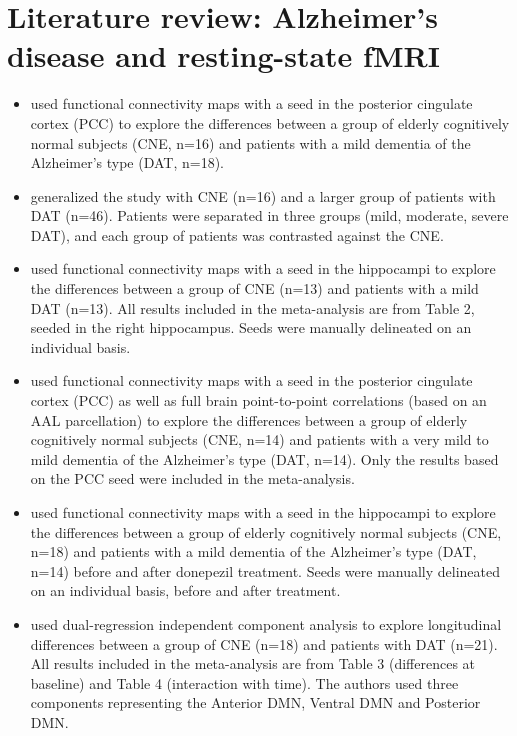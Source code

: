 \documentclass[authoryear]{elsarticle}
\begin{document}
\section*{Literature review: Alzheimer’s disease and resting-state fMRI} 
\begin{itemize}
\item \cite{Zhang2009a} used functional connectivity maps with a seed in the posterior cingulate cortex (PCC) to explore the differences between a group of elderly cognitively normal subjects (CNE, n=16) and patients with a mild dementia of the Alzheimer’s type (DAT, n=18).

\item \cite{Zhang2010} generalized the \cite{Zhang2009a} study with CNE (n=16) and a larger group of patients with DAT (n=46). Patients were separated in three groups (mild, moderate, severe DAT), and each group of patients was contrasted against the CNE.
\item \cite{Wang2006a} used functional connectivity maps with a seed in the hippocampi to explore the differences between a group of CNE (n=13) and patients with a mild DAT (n=13). All results included in the meta-analysis are from Table 2, seeded in the right hippocampus. Seeds were manually delineated on an individual basis.
\item \cite{Wang2007a} used functional connectivity maps with a seed in the posterior cingulate cortex (PCC) as well as full brain point-to-point correlations (based on an AAL parcellation) to explore the differences between a group of elderly cognitively normal subjects (CNE, n=14) and patients with a very mild to mild dementia of the Alzheimer’s type (DAT, n=14). Only the results based on the PCC seed were included in the meta-analysis.
\item \cite{Goveas2011} used functional connectivity maps with a seed in the hippocampi to explore the differences between a group of elderly cognitively normal subjects (CNE, n=18) and patients with a mild dementia of the Alzheimer’s type (DAT, n=14) before and after donepezil treatment. Seeds were manually delineated on an individual basis, before and after treatment.
\item \cite{Damoiseaux2012} used dual-regression independent component analysis to explore longitudinal differences between a group of CNE (n=18) and patients with DAT (n=21). All results included in the meta-analysis are from Table 3 (differences at baseline) and Table 4 (interaction with time). The authors used three components representing the Anterior DMN, Ventral DMN and Posterior DMN.
\end{itemize}
\end{document}
